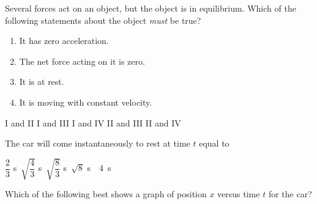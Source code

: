 \documentclass[12pt]{../../oss-apphys-exam}
\begin{document}
\begin{questions}
  \question Several forces act on an object, but the object is in equilibrium.
  Which of the following statements about the object \emph{must} be true?
  \begin{enumerate}[nosep]
  \item[I.] It has zero acceleration.
  \item[II.] The net force acting on it is zero.
  \item[III.] It is at rest.
  \item[IV.] It is moving with constant velocity.
  \end{enumerate}
  \begin{choices}
    \choice I and II
    \choice I and III
    \choice I and IV
    \choice II and III
    \choice II and IV
  \end{choices}
  \newpage
  
  
  \question The car will come instantaneously to rest at time $t$ equal to
  \label{toycar1}  
  \begin{choices}
    \choice$\dfrac23$ \si\second
    \choice$\sqrt{\dfrac43}$ \si\second
    \choice$\sqrt{\dfrac83}$ \si\second
    \choice$\sqrt8$ \si\second
    \choice\SI{4}{\second}
  \end{choices}

  \question Which of the following best shows a graph of position $x$ versus
  time $t$ for the car?
  
  \begin{oneparchoices}
    \choice

    \choice


\end{oneparchoices}
\end{questions}
\end{document}
